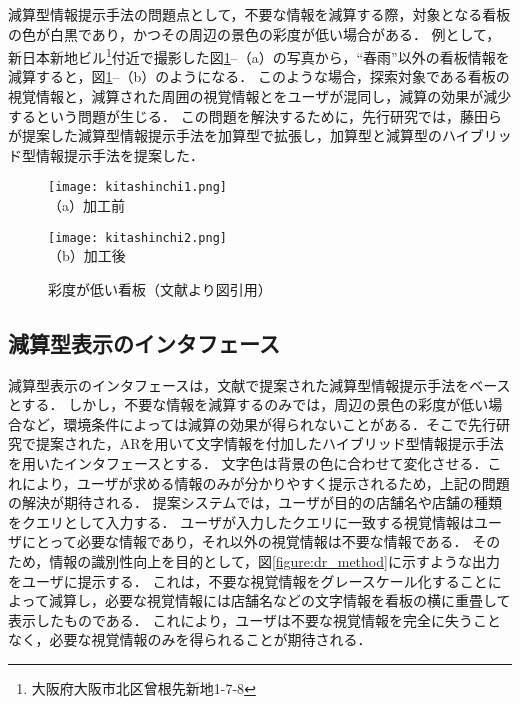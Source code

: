   減算型情報提示手法の問題点として，不要な情報を減算する際，対象となる看板の色が白黒であり，かつその周辺の景色の彩度が低い場合がある．
  例として，新日本新地ビル\footnote{大阪府大阪市北区曾根先新地1-7-8}付近で撮影した図\ref{figure:kitashinchi}--（a）の写真から，``春雨''以外の看板情報を減算すると，図\ref{figure:kitashinchi}--（b）のようになる．
  このような場合，探索対象である看板の視覚情報と，減算された周囲の視覚情報とをユーザが混同し，減算の効果が減少するという問題が生じる．
  この問題を解決するために，先行研究\cite{Kitamura:2017a, Kitamura:2017b}では，藤田らが提案した減算型情報提示手法を加算型で拡張し，加算型と減算型のハイブリッド型情報提示手法を提案した．

  \begin{figure}[t]
    \begin{minipage}{0.49\hsize}
        \begin{center}
          \texttt{[image: kitashinchi1.png]}\\
          \small{（a）加工前}
        \end{center}
    \end{minipage}
    \begin{minipage}{0.49\hsize}
        \begin{center}
          \texttt{[image: kitashinchi2.png]}\\
          \small{（b）加工後}
        \end{center}
    \end{minipage}
    \vspace{2pt}
    \caption{彩度が低い看板（文献\cite{Kitamura:2017a}より図引用）}
    \label{figure:kitashinchi}
  \end{figure}

  \subsection{減算型表示のインタフェース}
    減算型表示のインタフェースは，文献\cite{Fujita:2013}で提案された減算型情報提示手法をベースとする．
    しかし，不要な情報を減算するのみでは，周辺の景色の彩度が低い場合など，環境条件によっては減算の効果が得られないことがある．そこで先行研究\cite{Kitamura:2017a, Kitamura:2017b}で提案された，ARを用いて文字情報を付加したハイブリッド型情報提示手法を用いたインタフェースとする．
    文字色は背景の色に合わせて変化させる．これにより，ユーザが求める情報のみが分かりやすく提示されるため，上記の問題の解決が期待される．
    提案システムでは，ユーザが目的の店舗名や店舗の種類をクエリとして入力する．
    ユーザが入力したクエリに一致する視覚情報はユーザにとって必要な情報であり，それ以外の視覚情報は不要な情報である．
    そのため，情報の識別性向上を目的として，図\ref{figure:dr_method}に示すような出力をユーザに提示する．
    これは，不要な視覚情報をグレースケール化することによって減算し，必要な視覚情報には店舗名などの文字情報を看板の横に重畳して表示したものである．
    これにより，ユーザは不要な視覚情報を完全に失うことなく，必要な視覚情報のみを得られることが期待される．

